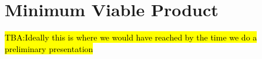 \let\textcircled=\pgftextcircled
\chapter{Minimum Viable Product}
\label{chap:intro}

\hl{TBA:Ideally this is where we would have reached by the time we do a preliminary presentation}